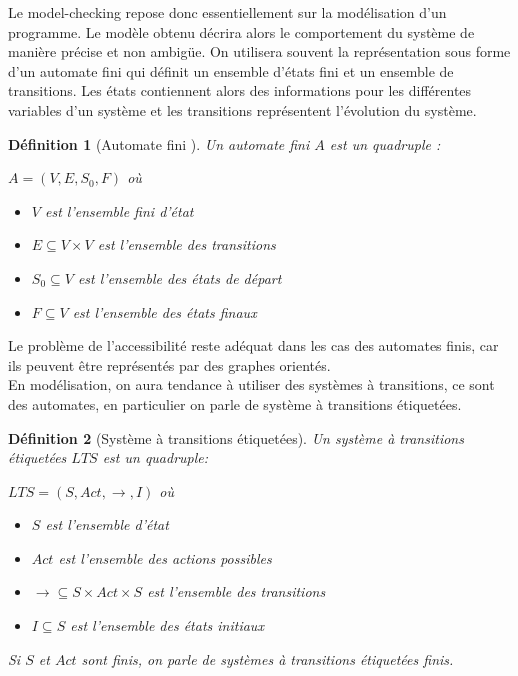 \documentclass[11pt,a4paper,oneside]{book}
\theoremstyle{break}
\newtheorem{defin}{Définition}
\theoremstyle{breakplain}
\begin{document}
Le model-checking repose donc essentiellement sur la modélisation d'un programme. Le modèle obtenu décrira alors le comportement du système de manière précise et non ambigüe. On utilisera souvent la représentation sous forme d'un automate fini qui définit un ensemble d'états fini et un ensemble de transitions. Les états contiennent alors des informations pour les différentes variables d'un système et les transitions représentent l'évolution du système.
\begin{defin}[Automate fini \cite{geeraerts2013multiprocessor}]
Un automate fini $A$ est un quadruple :
\begin{center}
$A=(V,E,S_0,F)$ où
\end{center}
\begin{itemize}
\item $V$ est l'ensemble fini d'état
\item $E \subseteq V \times V$ est l'ensemble des transitions
\item $S_0 \subseteq V$ est l'ensemble des états de départ
\item $F \subseteq V$ est l'ensemble des états finaux
\end{itemize}
\end{defin}

Le problème de l'accessibilité reste adéquat dans les cas des automates finis, car ils peuvent être représentés par des graphes orientés.\\

En modélisation, on aura tendance à utiliser des systèmes à transitions, ce sont des automates, en particulier on parle de système à transitions étiquetées.

\begin{defin}[Système à transitions étiquetées]
Un système à transitions étiquetées $LTS$ est un quadruple:
\begin{center}
$LTS = (S, Act, \rightarrow, I)$ où
\end{center}
\begin{itemize}
\item $S$ est l'ensemble d'état
\item $Act$ est l'ensemble des actions possibles
\item $\rightarrow \subseteq S \times Act \times S$ est l'ensemble des transitions
\item $I \subseteq S$ est l'ensemble des états initiaux
\end{itemize}
Si $S$ et $Act$ sont finis, on parle de systèmes à transitions étiquetées finis.
\end{defin}
\end{document}
